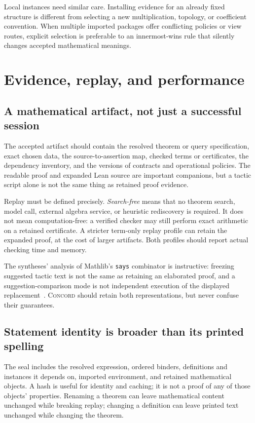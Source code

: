 \documentclass[11pt,a4paper]{article}
\newcommand{\code}[1]{\nolinkurl{#1}}
\newcommand{\Concord}{\textsc{Concord}}
\theoremstyle{definition}
\begin{document}
Local instances need similar care. Installing evidence for an already fixed structure is different from selecting a new multiplication, topology, or coefficient convention. When multiple imported packages offer conflicting policies or view routes, explicit selection is preferable to an innermost-wins rule that silently changes accepted mathematical meanings.

\section{Evidence, replay, and performance}\label{sec:replay}

\subsection{A mathematical artifact, not just a successful session}
The accepted artifact should contain the resolved theorem or query specification, exact chosen data, the source-to-assertion map, checked terms or certificates, the dependency inventory, and the versions of contracts and operational policies. The readable proof and expanded Lean source are important companions, but a tactic script alone is not the same thing as retained proof evidence.

Replay must be defined precisely. \emph{Search-free} means that no theorem search, model call, external algebra service, or heuristic rediscovery is required. It does not mean computation-free: a verified checker may still perform exact arithmetic on a retained certificate. A stricter term-only replay profile can retain the expanded proof, at the cost of larger artifacts. Both profiles should report actual checking time and memory.

The syntheses' analysis of Mathlib's \code{says} combinator is instructive: freezing suggested tactic text is not the same as retaining an elaborated proof, and a suggestion-comparison mode is not independent execution of the displayed replacement~\cite{synA,synB}. \Concord{} should retain both representations, but never confuse their guarantees.

\subsection{Statement identity is broader than its printed spelling}
The seal includes the resolved expression, ordered binders, definitions and instances it depends on, imported environment, and retained mathematical objects. A hash is useful for identity and caching; it is not a proof of any of those objects' properties. Renaming a theorem can leave mathematical content unchanged while breaking replay; changing a definition can leave printed text unchanged while changing the theorem.
\end{document}
